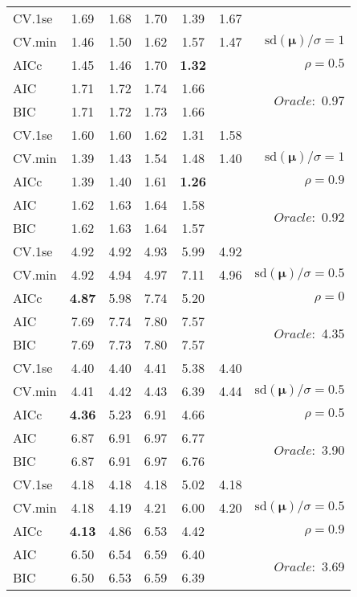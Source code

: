 \begin{table}
\begin{center}
\begin{tabular}{l*{5}{c}|r}
 \hline 
CV.1se & 1.69 & 1.68 & 1.70 & 1.39 & 1.67 & \\
CV.min & 1.46 & 1.50 & 1.62 & 1.57 & 1.47 &  $\mathrm{sd}(\mathbf{\mu})/\sigma=1$ \\
AICc & 1.45 & 1.46 & 1.70 & {\bf 1.32} & & $\rho=0.5$ \\
AIC & 1.71 & 1.72 & 1.74 & 1.66 & &  \multirow{2}{*}{$Oracle: $ 0.97} \\
BIC & 1.71 & 1.72 & 1.73 & 1.66 & &  \\
 \hline 
CV.1se & 1.60 & 1.60 & 1.62 & 1.31 & 1.58 & \\
CV.min & 1.39 & 1.43 & 1.54 & 1.48 & 1.40 &  $\mathrm{sd}(\mathbf{\mu})/\sigma=1$ \\
AICc & 1.39 & 1.40 & 1.61 & {\bf 1.26} & & $\rho=0.9$ \\
AIC & 1.62 & 1.63 & 1.64 & 1.58 & &  \multirow{2}{*}{$Oracle: $ 0.92} \\
BIC & 1.62 & 1.63 & 1.64 & 1.57 & &  \\
 \hline 
CV.1se & 4.92 & 4.92 & 4.93 & 5.99 & 4.92 & \\
CV.min & 4.92 & 4.94 & 4.97 & 7.11 & 4.96 &  $\mathrm{sd}(\mathbf{\mu})/\sigma=0.5$ \\
AICc & {\bf 4.87} & 5.98 & 7.74 & 5.20 & & $\rho=0$ \\
AIC & 7.69 & 7.74 & 7.80 & 7.57 & &  \multirow{2}{*}{$Oracle: $ 4.35} \\
BIC & 7.69 & 7.73 & 7.80 & 7.57 & &  \\
 \hline 
CV.1se & 4.40 & 4.40 & 4.41 & 5.38 & 4.40 & \\
CV.min & 4.41 & 4.42 & 4.43 & 6.39 & 4.44 &  $\mathrm{sd}(\mathbf{\mu})/\sigma=0.5$ \\
AICc & {\bf 4.36} & 5.23 & 6.91 & 4.66 & & $\rho=0.5$ \\
AIC & 6.87 & 6.91 & 6.97 & 6.77 & &  \multirow{2}{*}{$Oracle: $ 3.90} \\
BIC & 6.87 & 6.91 & 6.97 & 6.76 & &  \\
 \hline 
CV.1se & 4.18 & 4.18 & 4.18 & 5.02 & 4.18 & \\
CV.min & 4.18 & 4.19 & 4.21 & 6.00 & 4.20 &  $\mathrm{sd}(\mathbf{\mu})/\sigma=0.5$ \\
AICc & {\bf 4.13} & 4.86 & 6.53 & 4.42 & & $\rho=0.9$ \\
AIC & 6.50 & 6.54 & 6.59 & 6.40 & &  \multirow{2}{*}{$Oracle: $ 3.69} \\
BIC & 6.50 & 6.53 & 6.59 & 6.39 & &  \\
 \hline 
\end{tabular}
\end{center}
\vspace{-1cm}
\end{table}




